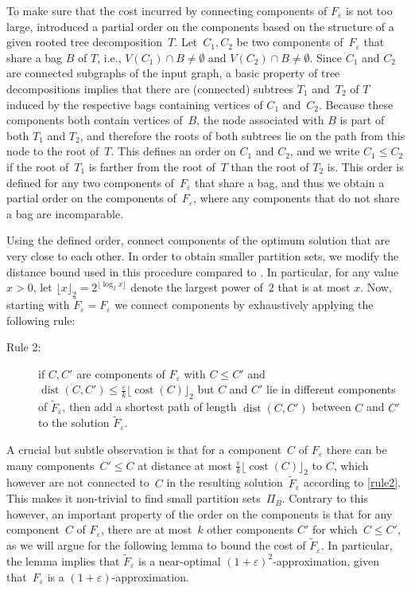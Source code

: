 \documentclass[a4paper]{article}
\makeatletter
\let\oldcitet\citet
\renewcommand{\citet}[1]{\mbox{\oldcitet{#1}}}
\theoremstyle{plain}
\newcommand{\eps}{{\varepsilon}}
\newcommand{\customlabel}[2]{%
   \protected@write \@auxout {}{\string \newlabel {#1}{{#2}{\thepage}{#2}{#1}{}} }%
   \hypertarget{#1}{}
}
\DeclareMathOperator{\cost}{cost}
\DeclareMathOperator{\dist}{dist}
\newcommand{\pow}[1]{\lfloor #1\rfloor_{2}}
\makeatother
\begin{document}
To make sure that the cost incurred by connecting components of $F_\eps$ is not too large, 
\cite{bateni2011approximation} introduced a partial order on the components based on the structure of a given rooted tree decomposition~$T$.
Let~$C_1,C_2$ be two components of~$F_\eps$ that share a bag $B$ of $T$, i.e.,
$V(C_1)\cap B\neq\emptyset$ and $V(C_2)\cap B\neq\emptyset$.  Since $C_1$ and
$C_2$ are connected subgraphs of the input graph, a basic property of tree
decompositions implies that there are (connected) subtrees $T_1$ and~$T_2$ of
$T$ induced by the respective bags containing vertices of $C_1$ and~$C_2$.
Because these components both contain vertices of~$B$, the node associated with
$B$ is part of both $T_1$ and $T_2$, and therefore the roots of both subtrees
lie on the path from this node to the root of~$T$.  This defines an order on
$C_1$ and $C_2$, and we write $C_1\leq C_2$ if the root of~$T_1$ is farther
from the root of~$T$ than the root of $T_2$ is.  This order is defined for any
two components of~$F_\eps$ that share a bag, and thus we obtain a partial order
on the components of~$F_\eps$, where any components that do not share a bag are
incomparable. 

Using the defined order, \citet{bateni2011approximation} connect components of the optimum solution that are very close to each other.
In order to obtain smaller partition sets, we modify the distance bound used in this procedure compared to \citet{bateni2011approximation}. 
In particular, for any value~$x>0$, let $\pow{x}=2^{\lfloor\log_{2}x\rfloor}$ 
denote the largest power of~$2$ that is at most $x$.
%
Now, starting with $\widetilde{F}_\eps=F_\eps$ we connect components by exhaustively applying the following rule:
\begin{description}
\item[Rule 2:]\customlabel{rule2}{Rule~2} if $C,C'$ are components of $F_\eps$ with $C\leq C'$ and $\dist(C,C')\leq\frac{\eps}{k}\pow{\cost(C)}$ but $C$ and $C'$ lie in different components of $\widetilde{F}_\eps$, then add a shortest path of length $\dist(C,C')$ between $C$ and $C'$ to the solution $\widetilde{F}_\eps$.
\end{description}

A crucial but subtle observation is that for a component~$C$ of $F_\eps$ there can be many components~$C'\leq C$ at distance at most $\frac{\eps}{k}\pow{\cost(C)}$ to $C$, 
which however are not connected to~$C$ in the resulting solution~$\widetilde{F}_\eps$ according to \autoref{rule2}. 
This makes it non-trivial to find small partition sets~$\Pi_B$.
Contrary to this however, an important property of the order on the components is that for any component~$C$ of $F_\eps$, 
there are at most~$k$ other components $C'$ for which~$C\leq C'$, as we will argue for the following lemma to bound the cost of $\widetilde{F}_\eps$. 
In particular, the lemma implies that $\widetilde{F}_\eps$ is a near-optimal $(1+\eps)^2$-approximation, given that~$F_\eps$ is a $(1+\eps)$-approximation.
\end{document}
